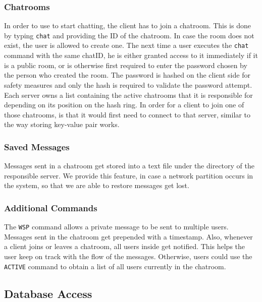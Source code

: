 \subsubsection{Chatrooms}
\label{sec:groupchat_funtionalities_chatcommand}
In order to use to start chatting, the client has to join a chatroom. This is done by typing \texttt{chat} and providing the ID of the chatroom. In case the room does not exist, the user is allowed to create one. The next time a user executes the \texttt{chat} command with the same chatID, he is either granted access to it immediately if it is a public room, or is otherwise first required to enter the password chosen by the person who created the room. The password is hashed on the client side for safety measures and only the hash is required to validate the password attempt.
Each server owns a list containing the active chatrooms that it is responsible for depending on its position on the hash ring. In order for a client to join one of those chatrooms, is that it would first need to connect to that server, similar to the way storing key-value pair works.

\subsubsection{Saved Messages}
\label{sec:groupchat_funtionalities_savedmessages}
Messages sent in a chatroom get stored into a text file under the directory of the responsible server. We provide this feature, in case a network partition occurs in the system, so that we are able to restore messages get lost.

\subsubsection{Additional Commands}
\label{sec:groupchat_funtionalities_commands}
The \texttt{WSP} command allows a private message to be sent to multiple users.
Messages sent in the chatroom get prepended with a timestamp. Also, whenever a client joins or leaves a chatroom, all users inside get notified. This helps the user keep on track with the flow of the messages. Otherwise, users could use the \texttt{ACTIVE} command to obtain a list of all users currently in the chatroom. 

\subsection{Database Access}
\label{sec:groupchat_chatbot}

